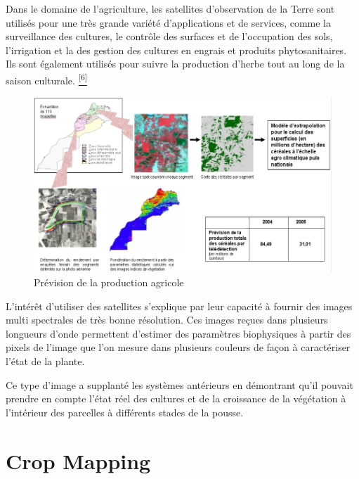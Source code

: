 \documentclass[12pt, openany]{report}
\begin{document}
Dans le domaine de l'agriculture, les satellites d'observation de la Terre sont utilisés pour une très grande variété d’applications et de services, comme la surveillance des cultures, le contrôle des surfaces et de l'occupation des sols, l'irrigation et la des gestion des cultures en engrais et produits phytosanitaires. Ils sont également utilisés pour suivre la production d'herbe tout au long de la saison culturale.  \hyperref[sec:refs]{\textsuperscript{[6]}}

\begin{figure}[hp]
\centering
\includegraphics[scale=0.65]{prev.jpg}
\caption{Prévision de la production agricole}
\end{figure}

L'intérêt d'utiliser des satellites s'explique par leur capacité à  fournir des images multi spectrales de très bonne résolution. Ces images reçues dans plusieurs longueurs d'onde permettent d'estimer des paramètres biophysiques à partir des pixels de l'image que l'on mesure dans plusieurs couleurs de façon à caractériser l'état de la plante.
\par
Ce type d'image a supplanté les systèmes antérieurs en démontrant qu'il pouvait prendre en compte l'état réel des cultures et de la croissance de la végétation à l'intérieur des parcelles à différents stades de la pousse.

\section{Crop Mapping}
\end{document}
